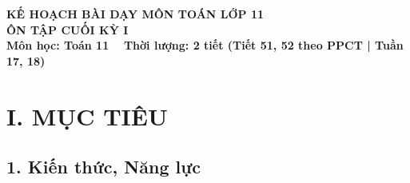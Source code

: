 \documentclass[12pt, a4paper]{article}
\begin{document}
\begin{center}
    {\fontsize{14pt}{17pt}\selectfont \textbf{KẾ HOẠCH BÀI DẠY MÔN TOÁN LỚP 11}}\\[6pt]
    {\fontsize{16pt}{19pt}\selectfont \textbf{ÔN TẬP CUỐI KỲ I}}\\[4pt]
    {\fontsize{12pt}{15pt}\selectfont \textbf{Môn học: Toán 11} \ \textbar \ \textbf{Thời lượng: 2 tiết (Tiết 51, 52 theo PPCT | Tuần 17, 18)}}
\end{center}

\vspace{5pt}

\section*{I. MỤC TIÊU}

\subsection*{1. Kiến thức, Năng lực}
\end{document}

